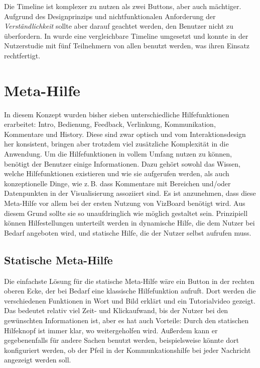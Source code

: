 \documentclass[
	headsepline,
	footsepline,
	fontsize=12pt,
	bibliography=totoc
]{scrbook}
\begin{document}
Die Timeline ist komplexer zu nutzen als zwei Buttons, aber auch mächtiger. Aufgrund des Designprinzips und nichtfunktionalen Anforderung der \emph{Verständlichkeit} sollte aber darauf geachtet werden, den Benutzer nicht zu überfordern. In \cite{Piccolotto2012} wurde eine vergleichbare Timeline umgesetzt und konnte in der Nutzerstudie mit fünf Teilnehmern von allen benutzt werden, was ihren Einsatz rechtfertigt.

\section{Meta-Hilfe}
\label{section:konzeption:meta-hilfe}


In diesem Konzept wurden bisher sieben unterschiedliche Hilfefunktionen erarbeitet: Intro, Bedienung, Feedback, Verlinkung, Kommunikation, Kommentare und History. Diese sind zwar optisch und vom Interaktionsdesign her konsistent, bringen aber trotzdem viel zusätzliche Komplexität in die Anwendung. Um die Hilfefunktionen in vollem Umfang nutzen zu können, benötigt der Benutzer einige Informationen. Dazu gehört sowohl das Wissen, welche Hilfefunktionen existieren und wie sie aufgerufen werden, als auch konzeptionelle Dinge, wie z.\,B. dass Kommentare mit Bereichen und/oder Datenpunkten in der Visualisierung assoziiert sind. Es ist anzunehmen, dass diese Meta-Hilfe vor allem bei der ersten Nutzung von VizBoard benötigt wird. Aus diesem Grund sollte sie so unaufdringlich wie möglich gestaltet sein. Prinzipiell können Hilfestellungen unterteilt werden in dynamische Hilfe, die dem Nutzer bei Bedarf angeboten wird, und statische Hilfe, die der Nutzer selbst aufrufen muss.

\subsection{Statische Meta-Hilfe}


Die einfachste Lösung für die statische Meta-Hilfe wäre ein Button in der rechten oberen Ecke, der bei Bedarf eine klassische Hilfefunktion aufruft. Dort werden die verschiedenen Funktionen in Wort und Bild erklärt und ein Tutorialvideo gezeigt. Das bedeutet relativ viel Zeit- und Klickaufwand, bis der Nutzer bei den gewünschten Informationen ist, aber es hat auch Vorteile: Durch den statischen Hilfeknopf ist immer klar, wo weitergeholfen wird. Außerdem kann er gegebenenfalls für andere Sachen benutzt werden, beispielsweise könnte dort konfiguriert werden, ob der Pfeil in der Kommunkationshilfe bei jeder Nachricht angezeigt werden soll.
\end{document}

